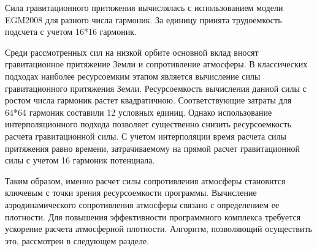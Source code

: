 Сила гравитационного притяжения вычислялась с использованием модели EGM2008 для
разного числа гармоник. За единицу принята трудоемкость подсчета с учетом 16*16 гармоник.

Среди рассмотренных сил на низкой орбите основной вклад вносят гравитационное притяжение Земли 
и сопротивление атмосферы.
В классических подходах наиболее ресурсоемким этапом является вычисление силы гравитационного 
притяжения Земли. Ресурсоемкость вычисления данной силы с ростом числа гармоник растет квадратичною.
Соответствующие затраты для 64*64 гармоник составили 12 условных единиц.
Однако использование интерполяционного подхода \cite{kuznetsov2023} позволяет существенно 
снизить ресурсоемкость расчета гравитационной силы. С учетом интерполяции время
расчета силы притяжения равно времени, затрачиваемому на прямой расчет гравитационной силы
с учетом 16 гармоник потенциала. 

Таким образом, именно расчет силы 
сопротивления атмосферы становится ключевым с точки зрения ресурсоемкости программы.
Вычисление аэродинамического сопротивления атмосферы связано 
с определением ее плотности.
Для повышения эффективности программного комплекса требуется ускорение расчета атмосферной плотности.
Алгоритм, позволяющий осуществить это, рассмотрен в следующем разделе.
